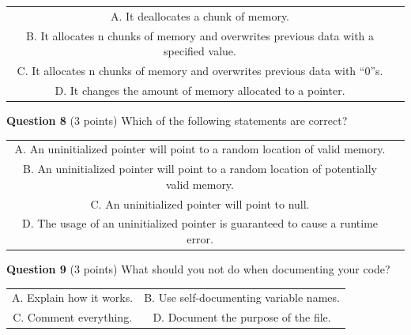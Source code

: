\documentclass{exam}
\begin{document}
\begin{center}

\begin{tabular} { c  c } 
  A. It deallocates a chunk of memory. \\
  B. It allocates n chunks of memory and overwrites previous data with a specified value. \\ 
  C. It allocates n chunks of memory and overwrites previous data with “0”s. \\ 
  D. It changes the amount of memory allocated to a pointer.
\end{tabular}

\end{center}

\vspace{10px}

\textbf{Question 8} (3 points) Which of the following statements are correct?

\begin{center}

\begin{tabular} { c  c } 
  A. An uninitialized pointer will point to a random location of valid memory. \\
  B. An uninitialized pointer will point to a random location of potentially valid memory. \\ 
  C. An uninitialized pointer will point to null. \\ 
  D. The usage of an uninitialized pointer is guaranteed to cause a runtime error.
\end{tabular}

\end{center}

\vspace{10px}

\textbf{Question 9} (3 points) What should you not do when documenting your code?

\begin{center}

\begin{tabular} { c  c } 
  A. Explain how it works. &
  B. Use self-documenting variable names. \\ 
  C. Comment everything. & 
  D. Document the purpose of the file.
\end{tabular}

\end{center}

\vspace{10px}
\end{document}
